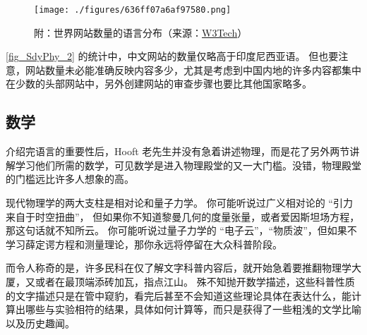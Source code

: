 \begin{figure}[ht]
\centering
\texttt{[image: ./figures/636ff07a6af97580.png]}
\caption{附：世界网站数量的语言分布（来源：\href{https://w3techs.com/technologies/overview/content_language}{W3Tech}）} \label{fig_SdyPhy_2}
\end{figure}

\autoref{fig_SdyPhy_2} 的统计中，中文网站的数量仅略高于印度尼西亚语。 但也要注意，网站数量未必能准确反映内容多少，尤其是考虑到中国内地的许多内容都集中在少数的头部网站中，另外创建网站的审查步骤也要比其他国家略多。

\subsection{数学}
介绍完语言的重要性后，Hooft 老先生并没有急着讲述物理，而是花了另外两节讲解学习他们所需的数学，可见数学是进入物理殿堂的又一大门槛。没错，物理殿堂的门槛远比许多人想象的高。

现代物理学的两大支柱是相对论和量子力学。 你可能听说过广义相对论的 “引力来自于时空扭曲”， 但如果你不知道黎曼几何的度量张量，或者爱因斯坦场方程，那这句话就不知所云。 你可能听说过量子力学的 “电子云”，“物质波”，但如果不学习薛定谔方程和测量理论，那你永远将停留在大众科普阶段。

而令人称奇的是，许多民科在仅了解文字科普内容后，就开始急着要推翻物理学大厦，又或者在最顶端添砖加瓦，指点江山。 殊不知抛开数学描述，这些科普性质的文字描述只是在管中窥豹，看完后甚至不会知道这些理论具体在表达什么，能计算出哪些与实验相符的结果，具体如何计算等，而只是获得了一些粗浅的文学比喻以及历史趣闻。
